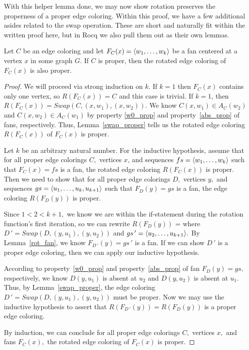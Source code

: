 With this helper lemma done, we may now show rotation preserves the properness of a proper edge coloring. Within this proof, we have a few additional asides related to the swap operation. These are short and naturally fit within the written proof here, but in Rocq we also pull them out as their own lemmas. 
\begin{prop}\label{rot_proper}
    Let $C$ be an edge coloring and let $F_C(x) = \langle w_1, \dots, w_k\rangle$ be a fan centered at a vertex $x$ in some graph $G.$ If $C$ is proper, then the rotated edge coloring of $F_C(x)$ is also proper.
\end{prop}
\begin{proof}
    We will proceed via strong induction on $k$. If $k = 1$ then $F_C(x)$ contains only one vertex, so $R(F_C(x)) = C$ and this case is trivial. If $k = 1$, then $R(F_C(x)) = Swap(C, (x, w_1), (x, w_2)).$ We know $C(x,w_1) \in A_C(w_2)$ and $C(x,w_2) \in A_C(w_1)$ by property \ref{w0_prop} and property~\ref{abs_prop} of fans, respectively. Thus, Lemma~\ref{swap_proper} tells us the rotated edge coloring $R(F_C(x))$ of $F_C(x)$ is proper.
    
    Let $k$ be an arbitrary natural number. For the inductive hypothesis, assume that for all proper edge colorings $C,$ vertices $x$, and sequences $fs = \langle w_1, \dots, w_k\rangle$ such that $F_C(x) = fs$ is a fan, the rotated edge coloring $R(F_C(x))$ is proper. Then we need to show that for all proper edge colorings $D,$ vertices $y,$ and sequences $gs = \langle u_1, \dots, u_k, u_{k+1} \rangle$ such that $F_{D}(y) = gs$ is a fan, the edge coloring $R(F_D(y))$ is proper.

    Since $1 < 2 < k + 1,$ we know we are within the if-statement during the rotation function's first iteration, so we can rewrite $R(F_D(y))$ =  where $D\,' = Swap(D,(y, u_1), (y,u_2))$ and $gs\,' = \langle u_2, \dots, u_{k+1} \rangle.$ By Lemma~\ref{rot_fan}, we know $F_{D\,'}(y) = gs\,'$ is a fan. If we can show $D\,'$ is a proper edge coloring, then we can apply our inductive hypothesis. 

    According to property~\ref{w0_prop} and property~\ref{abs_prop} of fan $F_D(y) = gs,$ respectively, we know $D(y, u_1)$ is absent at $u_2$ and $D(y, u_2)$ is absent at $u_1.$ Thus, by Lemma~\ref{swap_proper}, the edge coloring $D\,' = Swap(D,(y, u_1), (y,u_2))$ must be proper. Now we may use the inductive hypothesis to assert that $R(F_{D\,'}(y)) = R(F_D(y))$ is a proper edge coloring.
    
    By induction, we can conclude for all proper edge colorings $C,$ vertices $x,$ and fans $F_C(x),$ the rotated edge coloring of $F_C(x)$ is proper.
\end{proof}

